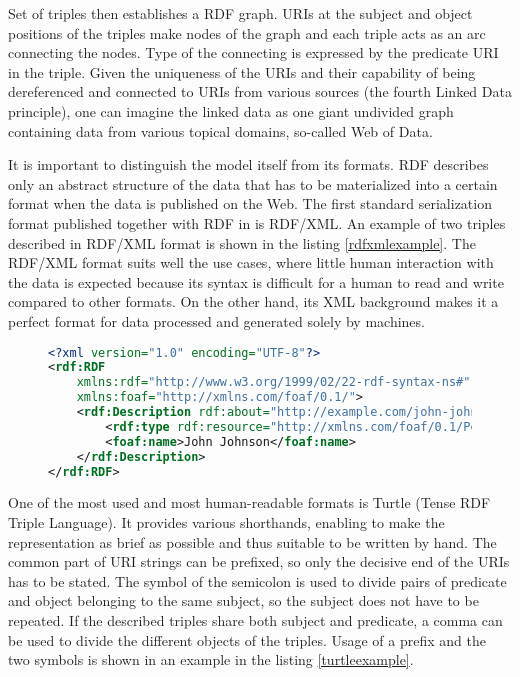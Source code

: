 Set of triples then establishes a RDF graph. URIs at the subject and object positions of the triples make nodes of the graph and each triple acts as an arc connecting the nodes. Type of the connecting is expressed by the predicate URI in the triple. Given the uniqueness of the URIs and their capability of being dereferenced and connected to URIs from various sources (the fourth Linked Data principle), one can imagine the linked data as one giant undivided graph containing data from various topical domains, so-called Web of Data.

It is important to distinguish the model itself from its formats. RDF describes only an abstract structure of the data that has to be materialized into a certain format when the data is published on the Web. The first standard serialization format published together with RDF in \cite{rdfPrimer2004} is RDF/XML. An example of two triples described in RDF/XML format is shown in the listing \ref{rdfxmlexample}. The RDF/XML format suits well the use cases, where little human interaction with the data is expected because its syntax is difficult for a human to read and write compared to other formats. On the other hand, its XML background makes it a perfect format for data processed and generated solely by machines.

\begin{figure}[h]
\begin{lstlisting}[language = XML, caption={Example of RDF data described in RDF/XML format (Source: author)}, label={rdfxmlexample},captionpos=b escapeinside={(*@}{@*)}]
<?xml version="1.0" encoding="UTF-8"?>
<rdf:RDF
    xmlns:rdf="http://www.w3.org/1999/02/22-rdf-syntax-ns#"
    xmlns:foaf="http://xmlns.com/foaf/0.1/">
    <rdf:Description rdf:about="http://example.com/john-johnson">
        <rdf:type rdf:resource="http://xmlns.com/foaf/0.1/Person"/>
        <foaf:name>John Johnson</foaf:name>
    </rdf:Description>
</rdf:RDF>
\end{lstlisting}
\end{figure}

One of the most used and most human-readable formats is Turtle (Tense RDF Triple Language).\cite{turtlew3c2014} It provides various shorthands, enabling to make the representation as brief as possible and thus suitable to be written by hand. The common part of URI strings can be prefixed, so only the decisive end of the URIs has to be stated. The symbol of the semicolon is used to divide pairs of predicate and object belonging to the same subject, so the subject does not have to be repeated. If the described triples share both subject and predicate, a comma can be used to divide the different objects of the triples. Usage of a prefix and the two symbols is shown in an example in the listing \ref{turtleexample}.

